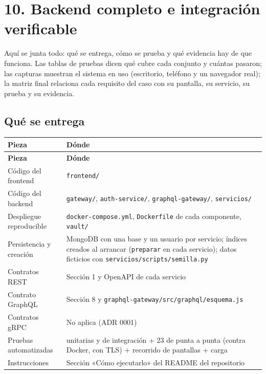 
\section{10. Backend completo e integración verificable}

Aquí se junta todo: qué se entrega, cómo se prueba y qué evidencia hay de que funciona. Las tablas de pruebas dicen qué cubre cada conjunto y cuántas pasaron; las capturas muestran el sistema en uso (escritorio, teléfono y un navegador real); la matriz final relaciona cada requisito del caso con su pantalla, su servicio, su prueba y su evidencia.


\subsection{Qué se entrega}

{\small
\setlength{\tabcolsep}{3pt}\renewcommand{\arraystretch}{1.15}
\begin{longtable}{|>{\raggedright\arraybackslash}p{}|>{\raggedright\arraybackslash}p{}|}
\hline
\textbf{Pieza} & \textbf{Dónde} \\ \hline
\endfirsthead
\hline
\textbf{Pieza} & \textbf{Dónde} \\ \hline
\endhead
Código del frontend & \texttt{frontend/\allowbreak{}} \\ \hline
Código del backend & \texttt{gateway/\allowbreak{}}, \texttt{auth-\allowbreak{}service/\allowbreak{}}, \texttt{graphql-\allowbreak{}gateway/\allowbreak{}}, \texttt{servicios/\allowbreak{}} \\ \hline
Despliegue reproducible & \texttt{docker-\allowbreak{}compose.\allowbreak{}yml}, \texttt{Dockerfile} de cada componente, \texttt{vault/\allowbreak{}} \\ \hline
Persistencia y creación & MongoDB con una base y un usuario por servicio; índices creados al arrancar (\texttt{preparar} en cada servicio); datos ficticios con \texttt{servicios/\allowbreak{}scripts/\allowbreak{}semilla.\allowbreak{}py} \\ \hline
Contratos REST & Sección 1 y OpenAPI de cada servicio \\ \hline
Contrato GraphQL & Sección 8 y \texttt{graphql-\allowbreak{}gateway/\allowbreak{}src/\allowbreak{}graphql/\allowbreak{}esquema.\allowbreak{}js} \\ \hline
Contratos gRPC & No aplica (ADR 0001) \\ \hline
Pruebas automatizadas & 86 unitarias y de integración + 23 de punta a punta (contra Docker, con TLS) + recorrido de pantallas + carga \\ \hline
Instrucciones & Sección «Cómo ejecutarlo» del README del repositorio \\ \hline
\end{longtable}
}

